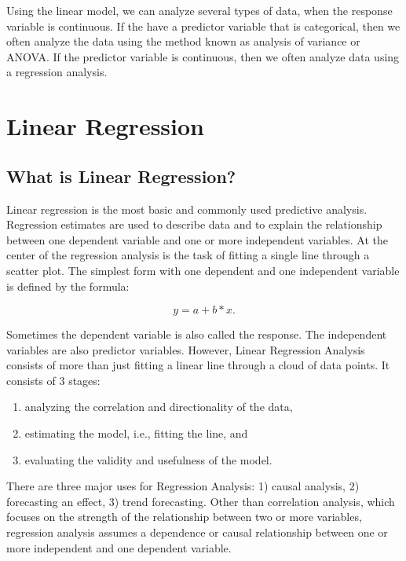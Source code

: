 \documentclass{article}\usepackage[]{graphicx}\usepackage[]{color}
\begin{document}
Using the linear model, we can analyze several types of data, when the response variable is continuous. If the have a predictor variable that is categorical, then we often analyze the data using the method known as analysis of variance or ANOVA. If the predictor variable is continuous, then we often analyze data using a regression analysis.

\section{Linear Regression}

\subsection{What is Linear Regression?}

Linear regression is the most basic and commonly used predictive analysis.  Regression estimates are used to describe data and to explain the relationship between one dependent variable and one or more independent variables.  At the center of the regression analysis is the task of fitting a single line through a scatter plot.  The simplest form with one dependent and one independent variable is defined by the formula:

\begin{equation}
y = a + b*x.
\end{equation}

Sometimes the dependent variable is also called the response.  The independent variables are also predictor variables.  However, Linear Regression Analysis consists of more than just fitting a linear line through a cloud of data points.  It consists of 3 stages:

\begin{enumerate}
  \item analyzing the correlation and directionality of the data, 
  \item estimating the model, i.e., fitting the line, and 
  \item evaluating the validity and usefulness of the model.
\end{enumerate}

There are three major uses for Regression Analysis: 1) causal analysis, 2) forecasting an effect, 3) trend forecasting.  Other than correlation analysis, which focuses on the strength of the relationship between two or more variables, regression analysis assumes a dependence or causal relationship between one or more independent and one dependent variable.
\end{document}
